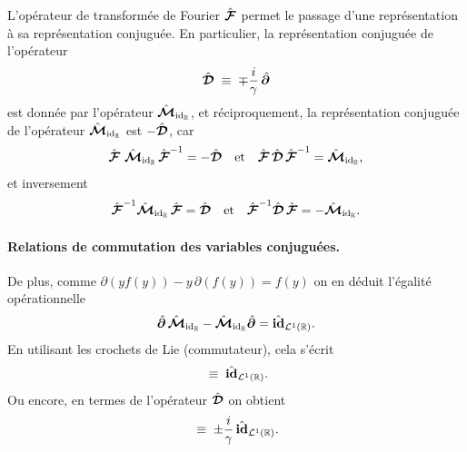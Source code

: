 L’opérateur de transformée de Fourier $\hat{\bm{\mathcal{F}}}$ permet le passage d’une représentation à sa représentation conjuguée. En particulier, la représentation conjuguée de l’opérateur
\begin{eqnarray}
    \hat{\bm{\mathcal{D}}} \;\equiv\; \mp \frac{i}{\gamma}\,\hat{\bm{\partial}}
\end{eqnarray}
est donnée par l’opérateur $\hat{\bm{\mathcal M}}_{\mathrm{id}_{\mathbb R}}$, et réciproquement, la représentation conjuguée de l’opérateur $\hat{\bm{\mathcal M}}_{\mathrm{id}_{\mathbb R}}$ est $-\hat{\bm{\mathcal{D}}}$, car 
\begin{eqnarray}\label{annex:1:TF.k.rep}
    \hat{\bm{\mathcal{F}}} \, \,  \hat{\bm{\mathcal M}}_{\mathrm{id}_{\mathbb R}} \, \hat{\bm{\mathcal{F}}}^{-1} = -\hat{\bm{\mathcal{D}}} \quad \mbox{et} \quad  \hat{\bm{\mathcal{F}}}\, \hat{\bm{\mathcal{D}}} \, \hat{\bm{\mathcal{F}}}^{-1} =  \hat{\bm{\mathcal M}}_{\mathrm{id}_{\mathbb R}}, 
\end{eqnarray}
et inversement 
\begin{eqnarray}\label{annex:1:TF.x.rep}
    \hat{\bm{\mathcal{F}}}^{-1} \hat{\bm{\mathcal M}}_{\mathrm{id}_{\mathbb R}} \, \hat{\bm{\mathcal{F}}} = \hat{\bm{\mathcal{D}}} \quad \mbox{et} \quad  \hat{\bm{\mathcal{F}}}^{-1}\hat{\bm{\mathcal{D}}} \, \hat{\bm{\mathcal{F}}} =  -\hat{\bm{\mathcal M}}_{\mathrm{id}_{\mathbb R}}.
\end{eqnarray}

\medskip

\paragraph{Relations de commutation des variables conjuguées.}

De plus, comme $\partial (y f(y)) - y \, \partial (f(y)) = f(y)$ on en déduit l’égalité opérationnelle 
\begin{eqnarray}
    \hat{\bm{\partial}}\, \hat{\bm{\mathcal M}}_{\mathrm{id}_{\mathbb R}} - \hat{\bm{\mathcal M}}_{\mathrm{id}_{\mathbb R}} \hat{\bm{\partial}} = \hat{\bm{\mathrm{id}}}_{\mathcal L^1 (\mathbb{R})}.
\end{eqnarray}
En utilisant les crochets de Lie (commutateur), cela s’écrit 
\begin{eqnarray}
    [\operator{\partial} ,  \operator{\mathcal M}_{\mathrm{id}_{\mathbb R}} ]\;\equiv\;\operator{\mathrm{id}}_{\mathcal L^1 (\mathbb{R})}.
\end{eqnarray}
Ou encore, en termes de l’opérateur $\hat{\bm{\mathcal{D}}}$ on obtient
\begin{eqnarray}
    [\operator{\mathcal M}_{\mathrm{id}_{\mathbb R}}, \operator{\mathcal{D}} ]\;\equiv\; \pm \frac{i}\gamma \,  \operator{\mathrm{id}}_{\mathcal L^1 (\mathbb{R})}.
\end{eqnarray}

